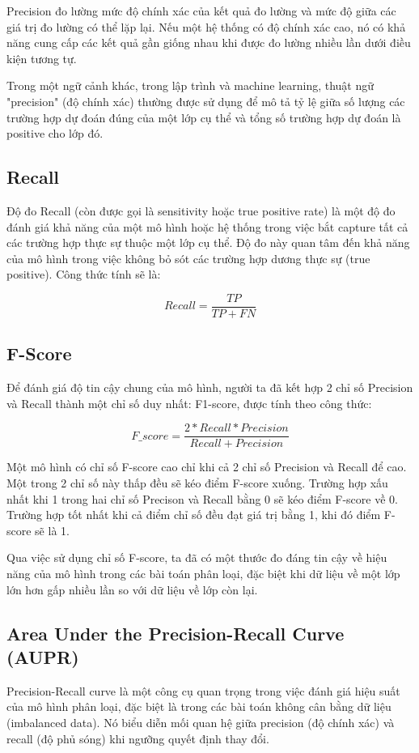Precision đo lường mức độ chính xác của kết quả đo lường và mức độ giữa các giá trị đo lường có thể lặp lại. Nếu một hệ thống có độ chính xác cao, nó có khả năng cung cấp các kết quả gần giống nhau khi được đo lường nhiều lần dưới điều kiện tương tự.

Trong một ngữ cảnh khác, trong lập trình và machine learning, thuật ngữ "precision" (độ chính xác) thường được sử dụng để mô tả tỷ lệ giữa số lượng các trường hợp dự đoán đúng của một lớp cụ thể và tổng số trường hợp dự đoán là positive cho lớp đó.

\subsection{Recall}

Độ đo Recall (còn được gọi là sensitivity hoặc true positive rate) là một độ đo đánh giá khả năng của một mô hình hoặc hệ thống trong việc bắt capture tất cả các trường hợp thực sự thuộc một lớp cụ thể. Độ đo này quan tâm đến khả năng của mô hình trong việc không bỏ sót các trường hợp dương thực sự (true positive). Công thức tính sẽ là: 

\[Recall = \frac{TP}{TP + FN}\]

\subsection{F-Score}
Để đánh giá độ tin cậy chung của mô hình, người ta đã kết hợp 2 chỉ số Precision và Recall thành một chỉ số duy nhất: F1-score, được tính theo công thức:

\[F\_score = \frac{2 * Recall * Precision}{Recall + Precision}\]

Một mô hình có chỉ số F-score cao chỉ khi cả 2 chỉ số Precision và Recall để cao. Một trong 2 chỉ số này thấp đều sẽ kéo điểm F-score xuống. Trường hợp xấu nhất khi 1 trong hai chỉ số Precison và Recall bằng 0 sẽ kéo điểm F-score về 0. Trường hợp tốt nhất khi cả điểm chỉ số đều đạt giá trị bằng 1, khi đó điểm F-score sẽ là 1.

Qua việc sử dụng chỉ số F-score, ta đã có một thước đo đáng tin cậy về hiệu năng của mô hình trong các bài toán phân loại, đặc biệt khi dữ liệu về một lớp lớn hơn gấp nhiều lần so với dữ liệu về lớp còn lại.


\subsection{Area Under the Precision-Recall Curve (AUPR)}
Precision-Recall curve là một công cụ quan trọng trong việc đánh giá hiệu suất của mô hình phân loại, đặc biệt là trong các bài toán không cân bằng dữ liệu (imbalanced data). Nó biểu diễn mối quan hệ giữa precision (độ chính xác) và recall (độ phủ sóng) khi ngưỡng quyết định thay đổi.

